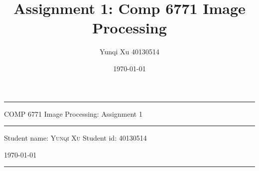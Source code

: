 \documentclass[12pt]{article}
\title{Assignment 1: Comp 6771 Image Processing}
\author{Yunqi Xu 40130514}
\date{\today}
\begin{document}

\begin{titlepage}
  \rule{\textwidth}{1pt}   %
    \vspace{0.2\textheight}  %


    {\Huge COMP 6771 Image Processing: Assignment 1}

    \vspace{0.025\textheight}   %

    \rule{0.83\textwidth}{0.4pt}  %

    \vspace{0.1\textheight}  %


    {\Large Student name: \textsc{Yunqi Xu}}
    \vfill
    {\Large Student id: 40130514}
    \vfill  %

    {\large \today}
    \vspace{0.1\textheight}  %


    \rule{\textwidth}{1pt}  %
\end{titlepage}
\end{document}
